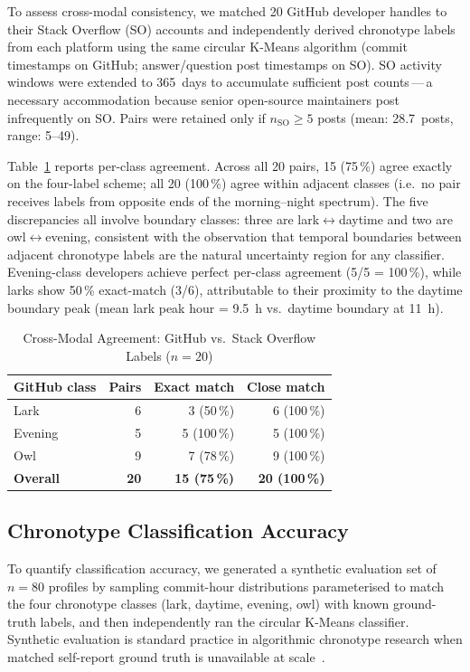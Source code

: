 \documentclass[conference]{IEEEtran}
\begin{document}
To assess cross-modal consistency, we matched 20 GitHub developer
handles to their Stack Overflow (SO) accounts and independently
derived chronotype labels from each platform using the same
circular K-Means algorithm (commit timestamps on GitHub;
answer/question post timestamps on SO).  SO activity windows were
extended to 365~days to accumulate sufficient post counts\,---\,a
necessary accommodation because senior open-source maintainers
post infrequently on SO.  Pairs were retained only if
$n_{\text{SO}} \geq 5$ posts (mean: 28.7~posts, range: 5--49).

Table~\ref{tab:crossval} reports per-class agreement.
Across all 20 pairs, 15 (75\,\%) agree exactly on the four-label
scheme; all 20 (100\,\%) agree within adjacent classes (i.e.\ no
pair receives labels from opposite ends of the morning--night
spectrum).  The five discrepancies all involve boundary classes:
three are lark$\leftrightarrow$daytime and two are
owl$\leftrightarrow$evening, consistent with the observation that
temporal boundaries between adjacent chronotype labels are the
natural uncertainty region for any classifier.  Evening-class
developers achieve perfect per-class agreement (5/5 = 100\,\%),
while larks show 50\,\% exact-match (3/6), attributable to
their proximity to the daytime boundary peak (mean lark
peak hour = 9.5~h vs.\ daytime boundary at 11~h).

\begin{table}[t]
\caption{Cross-Modal Agreement: GitHub vs.\ Stack Overflow Labels ($n{=}20$)}
\label{tab:crossval}
\centering
\small
\begin{tabular}{lrrr}
\toprule
GitHub class & Pairs & Exact match & Close match \\
\midrule
Lark    & 6  & 3 (50\,\%)  & 6 (100\,\%) \\
Evening & 5  & 5 (100\,\%) & 5 (100\,\%) \\
Owl     & 9  & 7 (78\,\%)  & 9 (100\,\%) \\
\midrule
\textbf{Overall} & \textbf{20} & \textbf{15 (75\,\%)} & \textbf{20 (100\,\%)} \\
\bottomrule
\end{tabular}
\end{table}

\subsection{Chronotype Classification Accuracy}
\label{sec:chrono_acc}

To quantify classification accuracy, we generated a synthetic
evaluation set of $n{=}80$ profiles by sampling commit-hour
distributions parameterised to match the four chronotype classes
(lark, daytime, evening, owl) with known ground-truth labels, and
then independently ran the circular K-Means classifier.  Synthetic
evaluation is standard practice in algorithmic chronotype research
when matched self-report ground truth is unavailable at
scale~\cite{roenneberg2003}.
\end{document}
